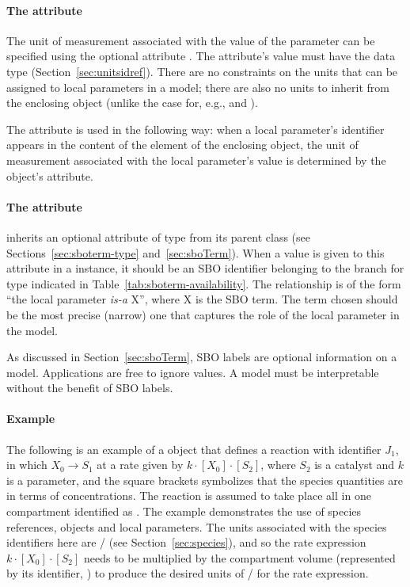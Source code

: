 \paragraph{The  attribute}
\label{subsec:localparameter-units}

The unit of measurement associated with the value of the parameter
can be specified using the optional attribute .  The
attribute's value must have the data type 
(Section~\ref{sec:unitsidref}).  There are no constraints on the
units that can be assigned to local parameters in a model; there
are also no units to inherit from the enclosing \Model object
(unlike the case for, e.g., \Species and \Compartment).

The  attribute is used in the following way: when a
local parameter's identifier appears in the content of the
 element of the enclosing \KineticLaw object, the unit
of measurement associated with the local parameter's value is
determined by the \LocalParameter object's 
attribute.


\paragraph{The  attribute}

\LocalParameter inherits an optional  attribute of
type  from its parent class \SBase (see
Sections~\ref{sec:sboterm-type} and~\ref{sec:sboTerm}).  When a
value is given to this attribute in a \LocalParameter instance, it
should be an SBO identifier belonging to the branch for type
\LocalParameter indicated in Table~\ref{tab:sboterm-availability}.
The relationship is of the form ``the local parameter \emph{is-a}
X'', where X is the SBO term.  The term chosen should be the most
precise (narrow) one that captures the role of the local parameter
in the model.

As discussed in Section~\ref{sec:sboTerm}, SBO labels are optional
information on a model.  Applications are free to ignore
 values.  A model must be interpretable without the
benefit of SBO labels.


\paragraph{Example}

The following is an example of a \Reaction object that defines a
reaction with identifier $J_1$, in which $X_0 \rightarrow S_1$ at
a rate given by $k \cdot [X_0] \cdot [S_2]$, where $S_2$ is a
catalyst and $k$ is a parameter, and the square brackets
symbolizes that the species quantities are in terms of
concentrations.  The reaction is assumed to take place all in one
compartment identified as .  The example demonstrates the
use of species references, \KineticLaw objects and local
parameters.  The units associated with the species identifiers
here are / (see
Section~\ref{sec:species}), and so the rate expression $k \cdot
[X_0] \cdot [S_2]$ needs to be multiplied by the compartment
volume (represented by its identifier, ) to produce the
desired units of / for the rate
expression.


